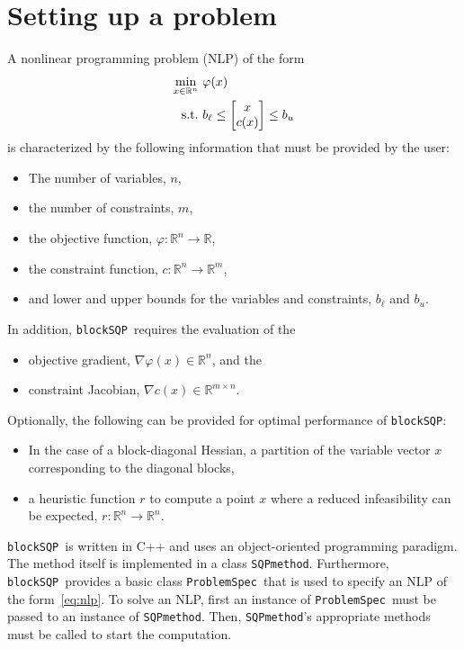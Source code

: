 \documentclass[	11pt,
				a4paper,
				abstract=true,
				twoside=true,
				bibliography=totoc, 
				headinclude=true,
				footinclude=false]{scrartcl}
\newcommand{\R}{\mathbb{R}}				%
\newcommand{\st}{\textup{s.t.}}
\newcommand{\blockSQP}{\texttt{blockSQP}}
\newcommand{\method}{\texttt{SQPmethod}}
\newcommand{\problem}{\texttt{ProblemSpec}}
\newcommand{\heu}{r}
\begin{document}
\section{Setting up a problem}
A nonlinear programming problem (NLP) of the form
\begin{subequations}\label{eq:nlp}
\begin{align}
\min_{x\in\R^{n}}\ &\varphi(x) \\
\st\ & b_{\ell} \leq \begin{bmatrix} x\\c(x)\end{bmatrix} \leq b_{u}
\end{align}
\end{subequations}
is characterized by the following information that must be provided by the user:
\begin{itemize}
\item The number of variables, $n$,
\item the number of constraints, $m$,
\item the objective function, $\varphi:\R^{n}\longrightarrow\R$,
\item the constraint function, $c:\R^{n}\longrightarrow\R^{m}$,
\item and lower and upper bounds for the variables and constraints, $b_{\ell}$ and $b_{u}$.
\end{itemize}
In addition, \blockSQP\ requires the evaluation of the
\begin{itemize}
\item objective gradient, $\nabla \varphi(x)\in\R^{n}$, and the
\item constraint Jacobian, $\nabla c(x)\in\R^{m\times n}$.
\end{itemize}
Optionally, the following can be provided for optimal performance of \blockSQP:
\begin{itemize}
\item In the case of a block-diagonal Hessian, a partition of the variable vector $x$ corresponding to the diagonal blocks,
\item a heuristic function $r$ to compute a point $x$ where a reduced infeasibility can be expected, $\heu:\R^{n}\longrightarrow\R^{n}$.
\end{itemize}

\blockSQP\ is written in C++ and uses an object-oriented programming paradigm. The method itself is implemented in a class \method. Furthermore, \blockSQP\ provides a basic class \problem\ that is used to specify an NLP of the form~\eqref{eq:nlp}. To solve an NLP, first an instance of \problem\ must be passed to an instance of \method. Then, \method's appropriate methods must be called to start the computation.
\end{document}
